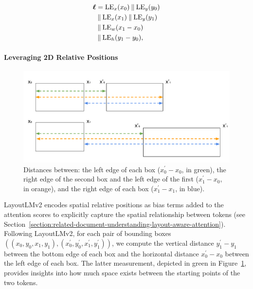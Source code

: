 \begin{equation}
  \begin{split}
      \boldsymbol{\ell} & = \text{LE}_x(x_0) \mathbin\Vert \text{LE}_y(y_0) \\
      & \mathbin\Vert \text{LE}_x(x_1) \mathbin\Vert \text{LE}_y(y_1) \\
      & \mathbin\Vert \text{LE}_w(x_1 - x_0) \\
      & \mathbin\Vert \text{LE}_h(y_1 - y_0), 
  \end{split}
\label{eq:layout-embeddings}
\end{equation}

\paragraph{Leveraging 2D Relative Positions} 

\begin{figure}
  \centering
  \includegraphics[width=\textwidth]{images/chapter4/bbox_distances.pdf}
  \caption{Distances between: the left edge of each box ($x^{\prime}_0 - x_0$, in green), the right edge of the second box and the left edge of the first ($x^{\prime}_1 - x_0$, in orange), and the right edge of each box ($x^{\prime}_1 - x_1$, in blue).}
  \label{fig:bbox-distances}
\end{figure}

LayoutLMv2 encodes spatial relative positions as bias terms added to the attention scores to explicitly capture the spatial relationship between tokens (see Section~\ref{section:related-document-understanding-layout-aware-attention}). Following LayoutLMv2, for each pair of bounding boxes $((x_0, y_0, x_1, y_1), (x^{\prime}_0, y^{\prime}_0, x^{\prime}_1, y^{\prime}_1))$, we compute the vertical distance $y^{\prime}_1 - y_1$ between the bottom edge of each box and the horizontal distance $x^{\prime}_0 - x_0$ between the left edge of each box. The latter measurement, depicted in green in Figure~\ref{fig:bbox-distances}, provides insights into how much space exists between the starting points of the two tokens.


